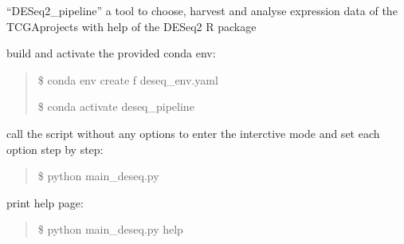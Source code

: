 \documentclass[letterpaper,10pt,english]{sphinxmanual}
\begin{document}
\begin{fulllineitems}
\label{\detokenize{index:main_deseq.call_with_options}}
\sphinxAtStartPar
“DESeq2\_pipeline” a tool to choose, harvest and analyse expression data of
the TCGA\sphinxhyphen{}projects with help of the DESeq2 R package

\sphinxAtStartPar
build and activate the provided conda env:
\begin{quote}

\sphinxAtStartPar
\$ conda env create \sphinxhyphen{}f deseq\_env.yaml

\sphinxAtStartPar
\$ conda activate deseq\_pipeline
\end{quote}

\sphinxAtStartPar
call the script without any options to enter the interctive mode and set
each option step by step:
\begin{quote}

\sphinxAtStartPar
\$ python main\_deseq.py
\end{quote}

\sphinxAtStartPar
print help page:
\begin{quote}

\sphinxAtStartPar
\$ python main\_deseq.py \textendash{}help
\end{quote}

\end{fulllineitems}

\label{\detokenize{index:module-choose_therapy}}
\end{document}
